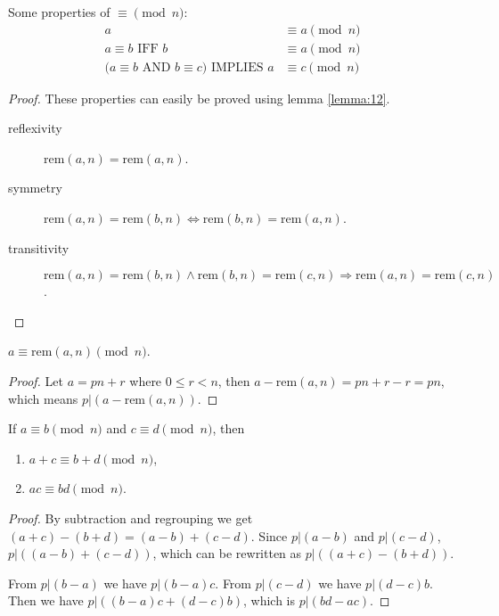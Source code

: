 \documentclass[11pt]{article}
\newcommand{\rem}{\mathrm{rem}}
\begin{document}
\begin{lemma}
Some properties of $\equiv \pmod{n}$:
\begin{align*}
a &\equiv a \pmod{n} \tag{reflexivity} \\
a \equiv b \text{ IFF } b &\equiv a \pmod{n} \tag{symmetry} \\
\text{(}a \equiv b \text{ AND } b \equiv c \text{)} \text{ IMPLIES } a &\equiv c \pmod{n}
\tag{transitivity}
\end{align*}
\end{lemma}

\begin{proof}
These properties can easily be proved using lemma \ref{lemma:12}.
\begin{description}
\item[reflexivity] $\rem(a,n) = \rem(a,n)$.
\item[symmetry] $\rem(a,n)=\rem(b,n) \Leftrightarrow \rem(b,n)=\rem(a,n)$.
\item[transitivity] $\rem(a,n)=\rem(b,n) \wedge \rem(b,n)=\rem(c,n) \Rightarrow \rem(a,n)=
\rem(c,n)$.
\end{description}
\end{proof}

\begin{lemma} \label{lemma:14}
$a \equiv \rem(a,n) \pmod{n}$.
\end{lemma}

\begin{proof}
Let $a = pn + r$ where $0 \leq r < n$, then $a-\rem(a,n)=pn+r-r=pn$, which means
$p|(a-\rem(a,n))$.
\end{proof}

\begin{lemma} \label{lemma:15}
If $a \equiv b \pmod{n}$ and $c \equiv d \pmod{n}$, then
\begin{enumerate}
\item $a + c \equiv b + d \pmod{n}$,
\item $ac \equiv bd \pmod{n}$.
\end{enumerate}
\end{lemma}

\begin{proof}
By subtraction and regrouping we get $(a+c)-(b+d)=(a-b)+(c-d)$. Since $p|(a-b)$ and
$p|(c-d)$, $p|((a-b)+(c-d))$, which can be rewritten as $p|((a+c)-(b+d))$.

From $p|(b-a)$ we have $p|(b-a)c$. From $p|(c-d)$ we have $p|(d-c)b$. Then we have
$p|( (b-a)c + (d-c)b )$, which is $p|(bd-ac)$.
\end{proof}
\end{document}
